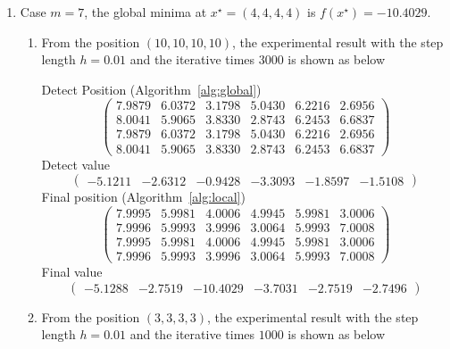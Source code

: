 \documentclass[11pt,fceqn]{article}
\numberwithin{equation}{section}
\theoremstyle{definition}
\begin{document}
\begin{enumerate}[label=\textbf{(\arabic*)}]
\begin{enumerate}[label=\textbf{(\alph*)}]
Detect Position (Algorithm~\ref{alg:global})
$$
\begin{pmatrix}
3.9957 & 6.0140  \\
4.0052 & 6.0068  \\
3.9957 & 6.0140  \\
4.0052 & 6.0068 
\end{pmatrix}
$$
Detect value
$$
\begin{pmatrix}
-10.1443 & -2.6794 
\end{pmatrix}
$$
Final position (Algorithm~\ref{alg:local})
$$
\begin{pmatrix}
4.0000 & 5.9987  \\
4.0001 & 6.0003  \\
4.0000 & 5.9987 \\
4.0001 & 6.0003
\end{pmatrix}
$$
Final value
$$
\begin{pmatrix}
-10.1532 & -2.6829 
\end{pmatrix}
$$
\end{enumerate}
\item Case $m=7$, the global minima at $x^{\star} = (4,4,4,4)$ is $f(x^{\star}) = - 10.4029$.
\begin{enumerate}[label=\textbf{(\alph*)}]
\item From the position $(10,10,10,10)$, the experimental result with the step length $h=0.01$ and the iterative times $3000$ is shown as below

Detect Position (Algorithm~\ref{alg:global})
$$
\begin{pmatrix}
7.9879 & 6.0372 & 3.1798 & 5.0430 & 6.2216 & 2.6956 \\
8.0041 & 5.9065 & 3.8330 & 2.8743 & 6.2453 & 6.6837 \\
7.9879 & 6.0372 & 3.1798 & 5.0430 & 6.2216 & 2.6956 \\
8.0041 & 5.9065 & 3.8330 & 2.8743 & 6.2453 & 6.6837
\end{pmatrix}
$$
Detect value 
$$
\begin{pmatrix}
-5.1211 & -2.6312 & -0.9428 & -3.3093 & -1.8597 & -1.5108
\end{pmatrix}
$$
Final position  (Algorithm~\ref{alg:local})
$$
\begin{pmatrix}
7.9995 & 5.9981 & 4.0006 & 4.9945 & 5.9981 & 3.0006 \\
7.9996 & 5.9993 & 3.9996 & 3.0064 & 5.9993 & 7.0008 \\
7.9995 & 5.9981 & 4.0006 & 4.9945 & 5.9981 & 3.0006 \\
7.9996 & 5.9993 & 3.9996 & 3.0064 & 5.9993 & 7.0008
\end{pmatrix}
$$
Final value
$$
\begin{pmatrix}
-5.1288 & -2.7519 & -10.4029 & -3.7031 & -2.7519 & -2.7496
\end{pmatrix}
$$
\item From the position $(3,3,3,3)$, the experimental result with the step length $h=0.01$ and the iterative times $1000$ is shown as below


\end{enumerate}
\end{enumerate}
\end{document}
